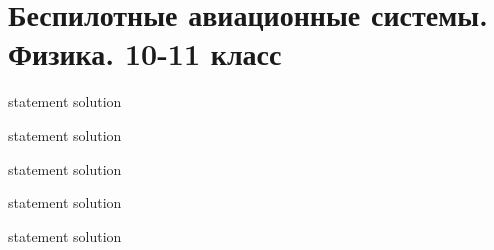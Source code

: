 \chapter{Беспилотные авиационные системы. Физика. 10-11 класс}

{statement}
{solution}

{statement}
{solution}

{statement}
{solution}

{statement}
{solution}

{statement}
{solution}